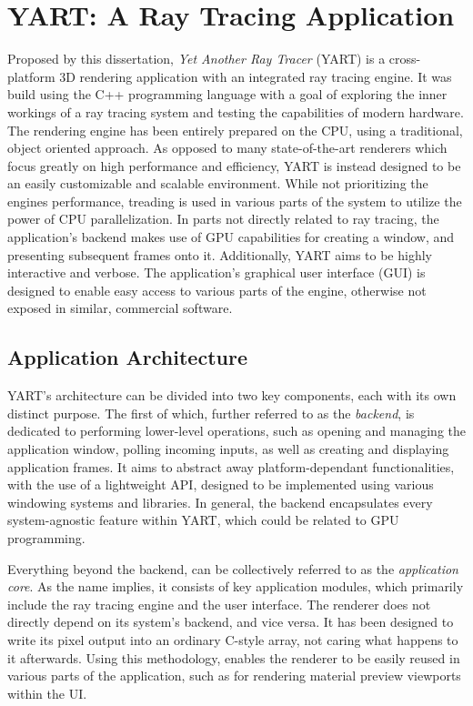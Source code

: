 \chapter{YART: A Ray Tracing Application} \label{ch:Application}

Proposed by this dissertation, \textit{Yet Another Ray Tracer} (YART) is a cross-platform 3D rendering application with an integrated ray tracing engine. 
It was build using the C++ programming language with a goal of exploring the inner workings of a ray tracing system and testing the capabilities of modern hardware.
The rendering engine has been entirely prepared on the CPU, using a traditional, object oriented approach.
As opposed to many state-of-the-art renderers which focus greatly on high performance and efficiency, YART is instead designed to be an easily customizable and scalable environment. 
While not prioritizing the engines performance, treading is used in various parts of the system to utilize the power of CPU parallelization.
In parts not directly related to ray tracing, the application's backend makes use of GPU capabilities for creating a window, and presenting subsequent frames onto it.
Additionally, YART aims to be highly interactive and verbose.
The application's graphical user interface (GUI) is designed to enable easy access to various parts of the engine, otherwise not exposed in similar, commercial software. 

\section{Application Architecture}

YART's architecture can be divided into two key components, each with its own distinct purpose.
The first of which, further referred to as the \textit{backend}, is dedicated to performing lower-level operations, such as opening and managing the application window, polling incoming inputs, as well as creating and displaying application frames. 
It aims to abstract away platform-dependant functionalities, with the use of a lightweight API, designed to be implemented using various windowing systems and libraries. 
In general, the backend encapsulates every system-agnostic feature within YART, which could be related to GPU programming.

Everything beyond the backend, can be collectively referred to as the \textit{application core}. 
As the name implies, it consists of key application modules, which primarily include the ray tracing engine and the user interface.
The renderer does not directly depend on its system's backend, and vice versa. 
It has been designed to write its pixel output into an ordinary C-style array, not caring what happens to it afterwards.
Using this methodology, enables the renderer to be easily reused in various parts of the application, such as for rendering material preview viewports within the UI.

